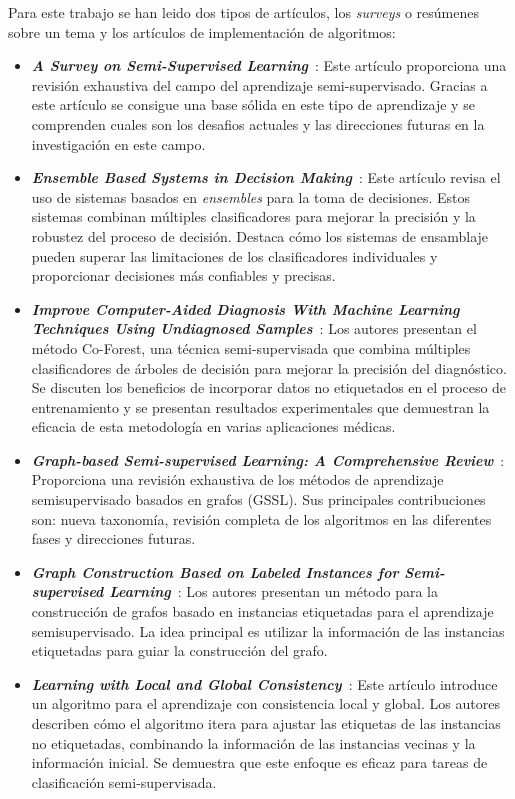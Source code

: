 Para este trabajo se han leido dos tipos de artículos, los \textit{surveys} o resúmenes sobre un tema y los artículos de implementación de algoritmos:
\begin{itemize}
	\item \textbf{\textit{A Survey on Semi-Supervised Learning}}~\cite{Engelen:semi-supervised}: Este artículo proporciona una revisión exhaustiva del campo del aprendizaje semi-supervisado. Gracias a este artículo se consigue una base sólida en este tipo de aprendizaje y se comprenden cuales son los desafios actuales y las direcciones futuras en la investigación en este campo.
	\item \textbf{\textit{Ensemble Based Systems in Decision Making}}~\cite{ensembles}: Este artículo revisa el uso de sistemas basados en \textit{ensembles} para la toma de decisiones. Estos sistemas combinan múltiples clasificadores para mejorar la precisión y la robustez del proceso de decisión. Destaca cómo los sistemas de ensamblaje pueden superar las limitaciones de los clasificadores individuales y proporcionar decisiones más confiables y precisas.
	\item \textbf{\textit{Improve Computer-Aided Diagnosis With Machine Learning Techniques Using Undiagnosed Samples}}~\cite{IEEE:CoForest}: Los autores presentan el método Co-Forest, una técnica semi-supervisada que combina múltiples clasificadores de árboles de decisión para mejorar la precisión del diagnóstico. Se discuten los beneficios de incorporar datos no etiquetados en el proceso de entrenamiento y se presentan resultados experimentales que demuestran la eficacia de esta metodología en varias aplicaciones médicas.
	\item \textbf{\textit{Graph-based Semi-supervised Learning: A Comprehensive Review}}~\cite{GSSL:review}: Proporciona una revisión exhaustiva de los métodos de aprendizaje semisupervisado basados en grafos (GSSL). Sus principales contribuciones son: nueva taxonomía, revisión completa de los algoritmos en las diferentes fases y direcciones futuras.
	\item \textbf{\textit{Graph Construction Based on Labeled Instances for Semi-supervised Learning}}~\cite{gbili}: Los autores presentan un método para la construcción de grafos basado en instancias etiquetadas para el aprendizaje semisupervisado. La idea principal es utilizar la información de las instancias etiquetadas para guiar la construcción del grafo.
	\item \textbf{\textit{Learning with Local and Global Consistency}}~\cite{LGC}: Este artículo introduce un algoritmo para el aprendizaje con consistencia local y global. Los autores describen cómo el algoritmo itera para ajustar las etiquetas de las instancias no etiquetadas, combinando la información de las instancias vecinas y la información inicial. Se demuestra que este enfoque es eficaz para tareas de clasificación semi-supervisada.

\end{itemize}
